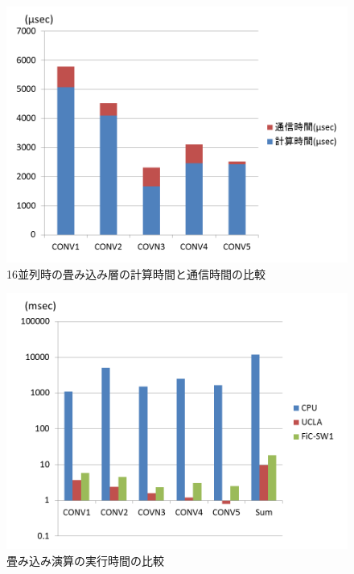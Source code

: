 \begin{figure}[ht]  
 \begin{center}   
	\includegraphics[width=1.0\columnwidth,bb=0 0 720 540]{img/time.png}
  \caption{16並列時の畳み込み層の計算時間と通信時間の比較}
  \label{gra_time}  
 \end{center}  
\end{figure}

\begin{figure}[ht]  
 \begin{center}   
	\includegraphics[width=1.0\columnwidth,bb=0 0 720 540]{img/cputime.png}
  \caption{畳み込み演算の実行時間の比較}
  \label{gra_cputime}  
 \end{center}  
\end{figure}


